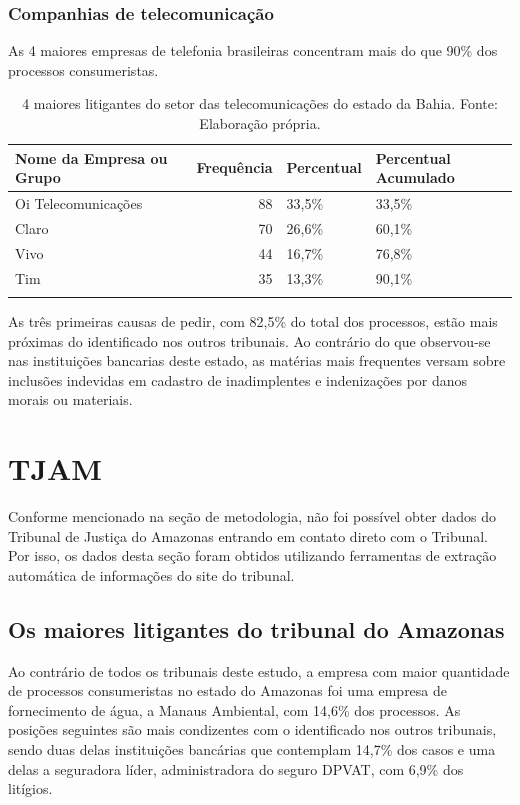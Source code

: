 \documentclass[]{report}
\begin{document}
\subsubsection{Companhias de
telecomunicação}\label{companhias-de-telecomunicacao}

As 4 maiores empresas de telefonia brasileiras concentram mais do que
90\% dos processos consumeristas.

\begin{longtable}{lrll}
\caption{4 maiores litigantes do setor das telecomunicações do estado da Bahia. Fonte: Elaboração própria.} \\
  \hline
Nome da Empresa ou Grupo & Frequência & Percentual & Percentual Acumulado \\
  \hline
Oi
Telecomunicações &  88 & 33,5\% & 33,5\% \\
  Claro &  70 & 26,6\% & 60,1\% \\
  Vivo &  44 & 16,7\% & 76,8\% \\
  Tim &  35 & 13,3\% & 90,1\% \\
   \hline
\hline
\label{unnamed-chunk-74}
\end{longtable}

As três primeiras causas de pedir, com 82,5\% do total dos processos,
estão mais próximas do identificado nos outros tribunais. Ao contrário
do que observou-se nas instituições bancarias deste estado, as matérias
mais frequentes versam sobre inclusões indevidas em cadastro de
inadimplentes e indenizações por danos morais ou materiais.

\section{TJAM}\label{tjam}

Conforme mencionado na seção de metodologia, não foi possível obter
dados do Tribunal de Justiça do Amazonas entrando em contato direto com
o Tribunal. Por isso, os dados desta seção foram obtidos utilizando
ferramentas de extração automática de informações do site do tribunal.

\subsection{Os maiores litigantes do tribunal do
Amazonas}\label{os-maiores-litigantes-do-tribunal-do-amazonas}

Ao contrário de todos os tribunais deste estudo, a empresa com maior
quantidade de processos consumeristas no estado do Amazonas foi uma
empresa de fornecimento de água, a Manaus Ambiental, com 14,6\% dos
processos. As posições seguintes são mais condizentes com o identificado
nos outros tribunais, sendo duas delas instituições bancárias que
contemplam 14,7\% dos casos e uma delas a seguradora líder,
administradora do seguro DPVAT, com 6,9\% dos litígios.
\end{document}
